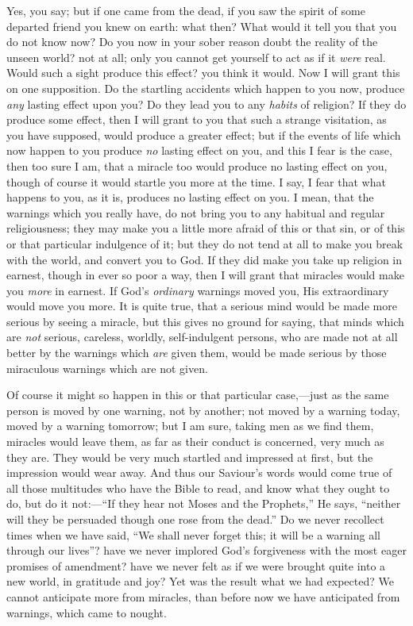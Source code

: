 Yes, you say; but if one came from the dead, if you saw the spirit
of some departed friend you knew on earth: what then? What would it
tell you that you do not know now? Do you now in your sober reason
doubt the reality of the unseen world? not at all; only you cannot get
yourself to act as if it \emph{were} real. Would such a sight produce
this effect? you think it would. Now I will grant this on one
supposition. Do the startling accidents which happen to you now,
produce \emph{any} lasting effect upon you? Do they lead you to any \emph{habits}
of religion? If they do produce some effect, then I will grant to you
that such a strange visitation, as you have supposed, would produce a
greater effect; but if the events of life which now happen to you
produce \emph{no} lasting effect on you, and this I fear is the case, then
too sure I am, that a miracle too would produce no lasting effect on
you, though of course it would startle you more at the time. I say, I
fear that what happens to you, as it is, produces no lasting effect on
you. I mean, that the warnings which you really have, do not bring you
to any habitual and regular religiousness; they may make you a little
more afraid of this or that sin, or of this or that particular
indulgence of it; but they do not tend at all to make you break with
the world, and convert you to God. If they did make you take up
religion in earnest, though in ever so poor a way, then I will grant
that miracles would make you \emph{more} in earnest. If God's \emph{ordinary}
warnings moved you, His extraordinary would move you more. It is quite
true, that a serious mind would be made more serious by seeing a
miracle, but this gives no ground for saying, that minds which are \emph{not}
serious, careless, worldly, self-indulgent persons, who are made not
at all better by the warnings which \emph{are} given them, would be
made serious by those miraculous warnings which are not given.

Of course it might so happen in this or that particular case,—just
as the same person is moved by one warning, not by another; not moved
by a warning today, moved by a warning tomorrow; but I am sure, taking
men as we find them, miracles would leave them, as far as their
conduct is concerned, very much as they are. They would be very much
startled and impressed at first, but the impression would wear away.
And thus our Saviour's words would come true of all those multitudes
who have the Bible to read, and know what they ought to do, but do it
not:—``If they hear not Moses and the Prophets,'' He says,
``neither will they be persuaded though one rose from the
dead.'' Do we never recollect times when we have said, ``We
shall never forget this; it will be a warning all through our
lives''? have we never implored God's forgiveness with the most
eager promises of amendment? have we never felt as if we were brought
quite into a new world, in gratitude and joy? Yet was the result what
we had expected? We cannot anticipate more from miracles, than before
now we have anticipated from warnings, which came to nought.

